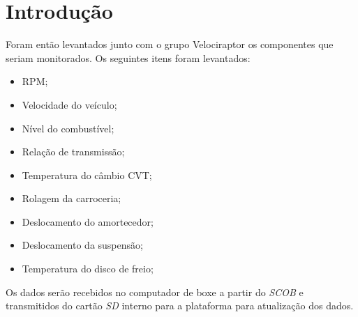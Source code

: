 \chapter{Introdução} 
	\label{ch:introducao}
Foram então levantados junto com o grupo Velociraptor os componentes que seriam monitorados. Os seguintes itens foram levantados: 
\begin{itemize}
	\item RPM;
	\item Velocidade do veículo;
	\item Nível do combustível;
	\item Relação de transmissão;
	\item Temperatura do câmbio CVT;
	\item Rolagem da carroceria;
	\item Deslocamento do amortecedor;
	\item Deslocamento da suspensão;
	\item Temperatura do disco de freio;
\end{itemize}
\newpage

Os dados serão recebidos no computador de boxe a partir do \textit{SCOB} e transmitidos do cartão \textit{SD} interno para a plataforma para atualização dos dados.  